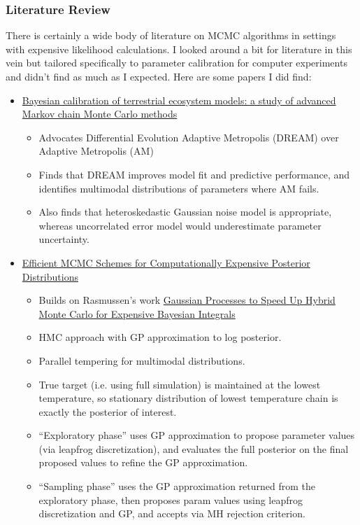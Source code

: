 \documentclass[12pt]{article}
\begin{document}
\subsubsection{Literature Review}
There is certainly a wide body of literature on MCMC algorithms in settings with expensive likelihood calculations. I looked around a bit for literature in this vein but 
tailored specifically to parameter calibration for computer experiments and didn't find as much as I expected. Here are some papers I did find: 
\begin{itemize}
\item \href{https://bg.copernicus.org/articles/14/4295/2017/}{Bayesian calibration of terrestrial ecosystem models: a study of advanced Markov chain Monte Carlo methods}
	\begin{itemize}
	\item Advocates Differential Evolution Adaptive Metropolis (DREAM) over Adaptive Metropolis (AM)
	\item Finds that DREAM improves model fit and predictive performance, and identifies multimodal distributions of parameters where AM fails. 
	\item Also finds that heteroskedastic Gaussian noise model is appropriate, whereas uncorrelated error model would underestimate parameter uncertainty. 
	\end{itemize}
\item \href{https://www.tandfonline.com/doi/abs/10.1198/TECH.2010.09195}{Efficient MCMC Schemes for Computationally Expensive Posterior Distributions}
	\begin{itemize}
	\item Builds on Rasmussen's work \href{http://mlg.eng.cam.ac.uk/pub/pdf/Ras03.pdf}{Gaussian Processes to Speed Up Hybrid Monte Carlo for Expensive Bayesian Integrals}
	\item HMC approach with GP approximation to log posterior.
	\item Parallel tempering for multimodal distributions.
	\item True target (i.e. using full simulation) is maintained at the lowest temperature, so stationary distribution of lowest temperature chain is exactly the posterior of interest. 
	\item ``Exploratory phase'' uses GP approximation to propose parameter values (via leapfrog discretization), and evaluates the full posterior on the final proposed values to refine the GP approximation.
	\item ``Sampling phase'' uses the GP approximation returned from the exploratory phase, then proposes param values using leapfrog discretization and GP, and accepts via MH rejection criterion.

\end{itemize}
\end{itemize}
\end{document}
